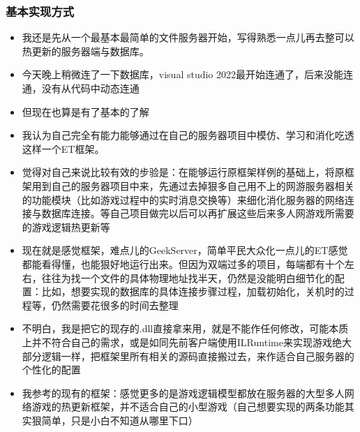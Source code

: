 \documentclass[9pt, b5paper]{article}
\begin{document}
\subsubsection{基本实现方式}
\label{sec-4-1-2}
\begin{itemize}
\item 我还是先从一个最基本最简单的文件服务器开始，写得熟悉一点儿再去整可以热更新的服务器端与数据库。
\item 今天晚上稍微连了一下数据库，visual studio 2022最开始连通了，后来没能连通，没有从代码中动态连通
\item 但现在也算是有了基本的了解
\item 我认为自己完全有能力能够通过在自己的服务器项目中模仿、学习和消化吃透这样一个ET框架。
\item 觉得对自己来说比较有效的步验是：在能够运行原框架样例的基础上，将原框架用到自己的服务器项目中来，先通过去掉狠多自己用不上的网游服务器相关的功能模块（比如游戏过程中的实时消息交换等）来细化消化服务器的网络连接与数据库连接。等自己项目做完以后可以再扩展这些后来多人网游戏所需要的游戏逻辑热更新等
\item 现在就是感觉框架，难点儿的GeekServer，简单平民大众化一点儿的ET感觉都能看得懂，也能狠好地运行出来。但因为双端过多的项目，每端都有十个左右，往往为找一个文件的具体物理地址找半天，仍然是没能明白细节化的配置：比如，想要实现的数据库的具体连接步骤过程，加载初始化，关机时的过程等，仍然需要花很多的时间去整理
\item 不明白，我是把它的现存的.dll直接拿来用，就是不能作任何修改，可能本质上并不符合自己的需求，或是如同先前客户端使用ILRuntime来实现游戏绝大部分逻辑一样，把框架里所有相关的源码直接搬过去，来作适合自己服务器的个性化的配置
\item 我参考的现有的框架：感觉更多的是游戏逻辑模型都放在服务器的大型多人网络游戏的热更新框架，并不适合自己的小型游戏（自己想要实现的两条功能其实狠简单，只是小白不知道从哪里下口）
\end{itemize}
\end{document}
